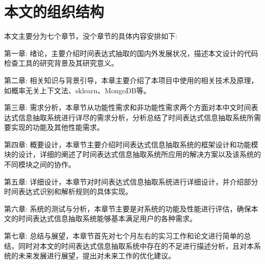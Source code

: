 \section{本文的组织结构}

本文主要分为七个章节，没个章节的具体内容安排如下:

第一章: 绪论，主要介绍时间表达式抽取的国内外发展状况，描述本文设计的代码检查工具的研究背景及其研究意义。

第二章: 相关知识与背景引导，本章主要介绍了本项目中使用的相关技术及原理，如概率无关上下文法、sklearn、MongoDB等。

第三章: 需求分析，本章节从功能性需求和非功能性需求两个方面对本中文时间表达式信息抽取系统进行详尽的需求分析，分析总结了时间表达式信息抽取系统所需要实现的功能及其他性能需求。

第四章: 概要设计，本章节主要介绍时间表达式信息抽取系统的框架设计和功能模块的设计，详细的阐述了时间表达式信息抽取系统所应用的解决方案以及该系统的不同模块之间的协作。

第五章: 详细设计，本章节对时间表达式信息抽取系统进行详细设计，并介绍部分时间表达式识别和解析规则的具体实现。

第六章: 系统的测试与分析，本章节主要是对系统的功能及性能进行评估，确保本文的时间表达式信息抽取系统能够基本满足用户的各种需求。

第七章: 总结与展望，本章节首先对七个月左右的实习工作和论文进行简单的总结，同时对本文的时间表达式信息抽取系统中存在的不足进行描述分析，且对本系统的未来发展进行展望，提出对未来工作的优化建议。

